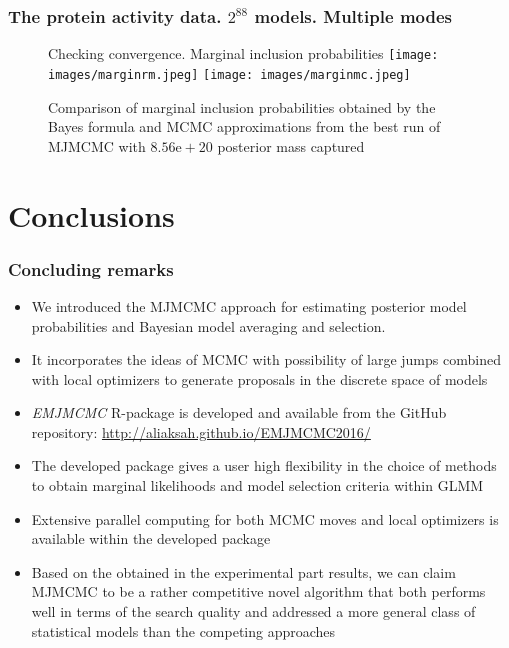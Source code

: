\documentclass{beamer}
\newcommand{\jwidth}{\righthyphenmin=20 \justifying}
\begin{document}
\begin{frame}
\frametitle{The protein activity data. $2^{88}$ models.  Multiple modes}
\begin{figure}
Checking convergence. Marginal inclusion probabilities
\texttt{[image: images/marginrm.jpeg]}
\texttt{[image: images/marginmc.jpeg]}
\caption{Comparison of marginal inclusion probabilities obtained by the Bayes formula and MCMC approximations from the best run of MJMCMC with $8.56\text{e}+20$ posterior mass captured}
\end{figure}

\end{frame}


\section{Conclusions}

\begin{frame}
\frametitle{Concluding remarks}

\begin{itemize}
\item \jwidth We introduced the MJMCMC approach for estimating posterior model probabilities and Bayesian model averaging and selection. 
\item \jwidth It incorporates the ideas of MCMC with possibility of large jumps combined with local optimizers to generate proposals in the discrete space of models
\item \jwidth \textit{EMJMCMC} R-package is developed and available from the GitHub repository: \url{http://aliaksah.github.io/EMJMCMC2016/}
\item \jwidth The developed package gives a user high flexibility in the choice of methods to obtain marginal likelihoods and model selection criteria within GLMM
\item \jwidth  Extensive parallel computing for both MCMC moves and local optimizers is available within the developed package
\item \jwidth Based on the obtained in the experimental part results, we can claim MJMCMC to be a rather competitive novel algorithm that both performs well in terms of the search quality and addressed a more general class of statistical models than the competing approaches
\end{itemize}

\end{frame}
\end{document}
